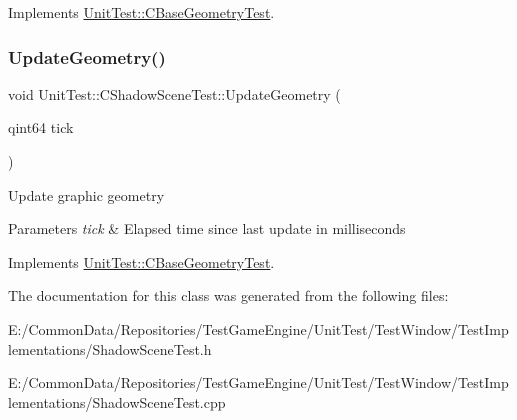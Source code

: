 Implements \mbox{\hyperlink{class_unit_test_1_1_c_base_geometry_test_a16e5804e7f134ae519722c47e756e3b0}{Unit\+Test\+::\+C\+Base\+Geometry\+Test}}.

\mbox{\label{class_unit_test_1_1_c_shadow_scene_test_a5586404efaf70bc59cefd4616fe7f761}} 
\subsubsection{\texorpdfstring{UpdateGeometry()}{UpdateGeometry()}}
{\footnotesize\ttfamily void Unit\+Test\+::\+C\+Shadow\+Scene\+Test\+::\+Update\+Geometry (\begin{DoxyParamCaption}\item[{qint64}]{tick }\end{DoxyParamCaption})\hspace{0.3cm}{\ttfamily [virtual]}}

Update graphic geometry 
\begin{DoxyParams}{Parameters}
{\em tick} & Elapsed time since last update in milliseconds \\
\hline
\end{DoxyParams}


Implements \mbox{\hyperlink{class_unit_test_1_1_c_base_geometry_test_afe9560d667ef457f7a203453c10593fd}{Unit\+Test\+::\+C\+Base\+Geometry\+Test}}.



The documentation for this class was generated from the following files\+:\begin{DoxyCompactItemize}
\item 
E\+:/\+Common\+Data/\+Repositories/\+Test\+Game\+Engine/\+Unit\+Test/\+Test\+Window/\+Test\+Implementations/Shadow\+Scene\+Test.\+h\item 
E\+:/\+Common\+Data/\+Repositories/\+Test\+Game\+Engine/\+Unit\+Test/\+Test\+Window/\+Test\+Implementations/Shadow\+Scene\+Test.\+cpp\end{DoxyCompactItemize}
